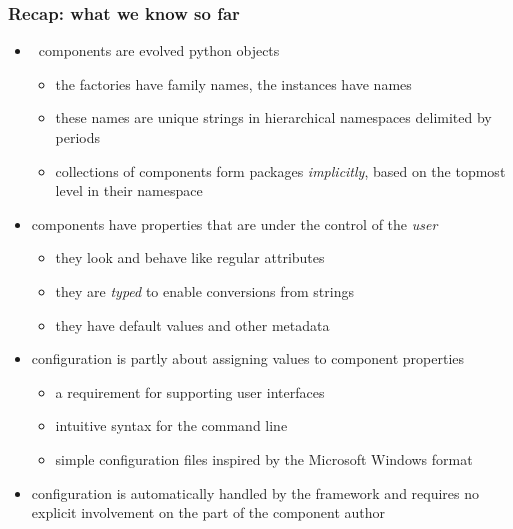 \begin{frame}
%
  \frametitle{Recap: what we know so far}
%
  \begin{itemize}
%
  \item \pyre\ components are evolved python objects
    \begin{itemize}
    \item the factories have family names, the instances have names
    \item these names are unique strings in hierarchical namespaces delimited by periods
    \item collections of components form packages \emph{implicitly}, based on the topmost level
      in their namespace
    \end{itemize}
%
  \item components have properties that are under the control of the \emph{user}
    \begin{itemize}
    \item they look and behave like regular attributes
    \item they are \emph{typed} to enable conversions from strings
    \item they have default values and other metadata
    \end{itemize}
%
  \item configuration is partly about assigning values to component properties
    \begin{itemize}
    \item a requirement for supporting user interfaces
    \item intuitive syntax for the command line
    \item simple configuration files inspired by the Microsoft Windows  format
    \end{itemize}
%
  \item configuration is automatically handled by the framework and requires no explicit
    involvement on the part of the component author
%
  \end{itemize}
%
\end{frame}

